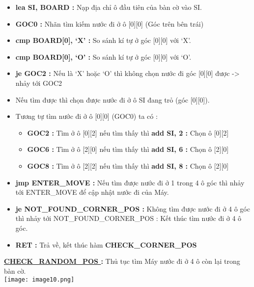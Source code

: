 \begin{itemize}
    \item \textbf{lea SI, BOARD :} Nạp địa chỉ ô đầu tiên của bàn cờ vào SI.
    \item \textbf{GOC0 :} Nhãn tìm kiếm nước đi ở ô [0][0] (Góc trên bên trái) 
    \item \textbf{cmp BOARD[0], ‘X’ :} So sánh kí tự ở góc [0][0] với ‘X’.
    \item \textbf{cmp BOARD[0], ‘O’ :} So sánh kí tự ở góc [0][0] với ‘O’.
    \item \textbf{je GOC2 :} Nếu là ‘X’ hoặc ‘O’ thì không chọn nước đi góc [0][0] được -> nhảy tới GOC2 
    \item Nếu tìm được thì chọn được nước đi ở ô SI đang trỏ (góc [0][0]).
    \item Tương tự tìm nước đi ở ô [0][0] (GOC0) ta có : 
    \begin{itemize}
        \item \textbf{GOC2 :} Tìm ở ô [0][2] nếu tìm thấy thì \textbf{add SI, 2 :} Chọn ô [0][2]
        \item \textbf{GOC6 :} Tìm ở ô [2][0] nếu tìm thấy thì \textbf{add SI, 6 :} Chọn ô [2][0]
        \item \textbf{GOC8 : }Tìm ở ô [2][2] nếu tìm thấy thì \textbf{add SI, 8 :} Chọn ô [2][0]
    \end{itemize}
    \item \textbf{jmp ENTER\_MOVE :} Nếu tìm được nước đi ở 1 trong 4 ô góc thì nhảy tới ENTER\_MOVE để cập nhật nước đi của Máy.
    \item \textbf{je NOT\_FOUND\_CORNER\_POS :} Không tìm được nước đi ở 4 ô góc thì nhảy tới NOT\_FOUND\_CORNER\_POS : Kết thúc tìm nước đi ở 4 ô góc.
    \item \textbf{RET :} Trả về, kết thúc hàm \textbf{CHECK\_CORNER\_POS}
\end{itemize}


\textbf{\underline{CHECK\_RANDOM\_POS }: }Thủ tục tìm Máy nước đi ở 4 ô còn lại trong bàn cờ.\\
\texttt{[image: image10.png]}

